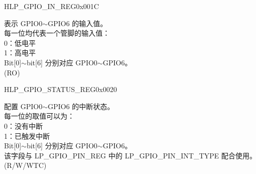 \begin{register}{H}{LP\_GPIO\_IN\_REG}{0x001C}\label{regdesc:LPGPIOINREG}
%
%
\regnewline%
\begin{regdesc}\begin{reglist}
\label{fielddesc:LPGPIOINDATANEXT}\item [LP\_GPIO\_IN\_DATA\_NEXT] 表示 GPIO0$\sim$GPIO6 的输入值。\\
每一位均代表一个管脚的输入值：\\
0：低电平\\
1：高电平\\
Bit[0]$\sim$bit[6] 分别对应 GPIO0$\sim$GPIO6。\\ (RO)
\end{reglist}\end{regdesc}
\end{register}


\begin{register}{H}{LP\_GPIO\_STATUS\_REG}{0x0020}\label{regdesc:LPGPIOSTATUSREG}
%
%
\regnewline%
\begin{regdesc}\begin{reglist}
\label{fielddesc:LPGPIOSTATUSINTERRUPT}\item [LP\_GPIO\_STATUS\_INTERRUPT] 配置 GPIO0$\sim$GPIO6 的中断状态。\\
每一位的取值可以为：\\
0：没有中断\\
1：已触发中断\\
Bit[0]$\sim$bit[6] 分别对应 GPIO0$\sim$GPIO6。\\
该字段与 LP\_GPIO\_PIN\_REG 中的 LP\_GPIO\_PIN\_INT\_TYPE 配合使用。\\
 (R/W/WTC)
\end{reglist}\end{regdesc}
\end{register}


